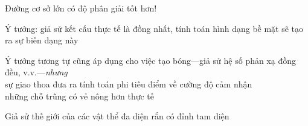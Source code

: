 \documentclass{article}
\begin{document}
\begin{huge}
Đường cơ sở lớn \mat{$\implies$} có độ phân giải tốt hơn!




\vspace*{0.2in}

\textwidth
{}

Ý tưởng: giả sử kết cấu thực tế là đồng nhất, tính toán hình dạng bề mặt sẽ tạo ra sự biến dạng này

Ý tưởng tương tự cũng áp dụng cho việc tạo bóng---giả sử hệ số phản xạ đồng đều, v.v.---\emph{nhưng}\\
sự giao thoa đưa ra tính toán phi tiêu điểm về cường độ cảm nhận \\
\mat{$\implies$} những chỗ trũng có vẻ nông hơn thực tế




\vspace*{0.2in}

\textwidth
{}

\textwidth
{}

Giả sử thế giới của các vật thể đa diện rắn có đỉnh tam diện



\vspace*{0.2in}

\textwidth
{}

\vspace*{0.2in}

\textwidth
{}



\end{huge}
\end{document}
